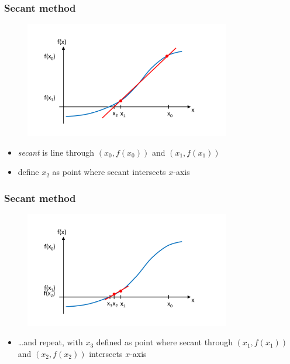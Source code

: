 \documentclass[english,14pt]{beamer}
\newcommand\red[1]{{\color{red} #1}}
\begin{document}

\begin{frame}[fragile]

\frametitle{Secant method}

\vspace*{-15mm}
\begin{figure}[ht]
	\centering
	\includegraphics[width=0.8\textwidth]{figures/secant2}
\end{figure}
\vspace*{-10mm}
\begin{itemize}
	\item \emph{\red{secant}} is line through $(x_0,f(x_0))$ and $(x_1,f(x_1))$
	\item define $x_2$ as point where secant intersects $x$-axis
\end{itemize}

\end{frame}


\begin{frame}[fragile]

\frametitle{Secant method}

\vspace*{-15mm}
\begin{figure}[ht]
	\centering
	\includegraphics[width=0.8\textwidth]{figures/secant3}
\end{figure}
\vspace*{-10mm}
\begin{itemize}
	\item[] \ldots and repeat, with $x_3$ defined as point where secant through $(x_1,f(x_1))$ and $(x_2,f(x_2))$ intersects $x$-axis
\end{itemize}

\end{frame}
\end{document}
